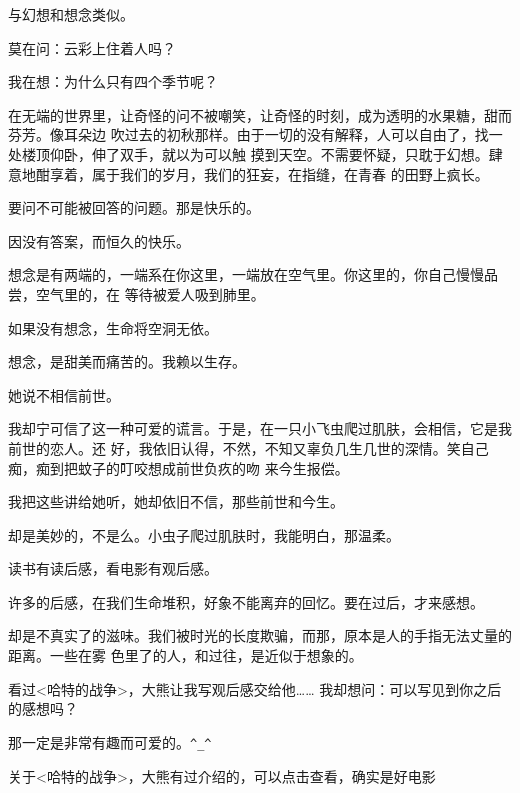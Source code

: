 		与幻想和想念类似。

	\endwriting




		莫在问：云彩上住着人吗？

		我在想：为什么只有四个季节呢？

		\vspace{1em}
		在无端的世界里，让奇怪的问不被嘲笑，让奇怪的时刻，成为透明的水果糖，甜而芬芳。像耳朵边
	吹过去的初秋那样。由于一切的没有解释，人可以自由了，找一处楼顶仰卧，伸了双手，就以为可以触
	摸到天空。不需要怀疑，只耽于幻想。肆意地酣享着，属于我们的岁月，我们的狂妄，在指缝，在青春
	的田野上疯长。

		要问不可能被回答的问题。那是快乐的。

		因没有答案，而恒久的快乐。



		想念是有两端的，一端系在你这里，一端放在空气里。你这里的，你自己慢慢品尝，空气里的，在
	等待被爱人吸到肺里。

		如果没有想念，生命将空洞无依。

		想念，是甜美而痛苦的。我赖以生存。



		她说不相信前世。

		我却宁可信了这一种可爱的谎言。于是，在一只小飞虫爬过肌肤，会相信，它是我前世的恋人。还
	好，我依旧认得，不然，不知又辜负几生几世的深情。笑自己痴，痴到把蚊子的叮咬想成前世负疚的吻
	来今生报偿。

		我把这些讲给她听，她却依旧不信，那些前世和今生。

		却是美妙的，不是么。小虫子爬过肌肤时，我能明白，那温柔。



		读书有读后感，看电影有观后感。

		许多的后感，在我们生命堆积，好象不能离弃的回忆。要在过后，才来感想。

		却是不真实了的滋味。我们被时光的长度欺骗，而那，原本是人的手指无法丈量的距离。一些在雾
	色里了的人，和过往，是近似于想象的。

		看过<哈特的战争>，大熊让我写观后感交给他…… 我却想问：可以写见到你之后的感想吗？

		那一定是非常有趣而可爱的。\verb|^_^|

		关于<哈特的战争>，大熊有过介绍的，可以点击查看，确实是好电影


